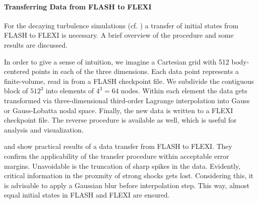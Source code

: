 
\paragraph{Transferring Data from \textsc{FLASH} to \textsc{FLEXI}}
For the decaying turbulence simulations (cf. ) a transfer of
initial states from FLASH to FLEXI is necessary. A brief overview of the
procedure and some results are discussed.

In order to give a sense of intuition, we imagine a Cartesian grid with 512
body-centered points in each of the three dimensions. Each data point
represents a finite-volume, read in from a FLASH checkpoint file. We subdivide
the contiguous block of $512^3$ into elements of $4^3 = 64$ nodes.  Within each
element the data gets transformed via three-dimensional third-order Lagrange
interpolation into Gauss or Gauss-Lobatta nodal space. Finally, the new data is
written to a FLEXI checkpoint file. The reverse procedure is available as well,
which is useful for analysis and visualization. 


 and
 show practical results of a data
transfer from FLASH to FLEXI. They confirm the applicability of the transfer
procedure within acceptable error margins. Unavoidable is the truncation of
sharp spikes in the data. Evidently, critical information in the proxmity of
strong shocks gets lost. Considering this, it is advisable to apply a
Gaussian blur before interpolation step. This way, almost equal initial
states in FLASH and FLEXI are ensured.

